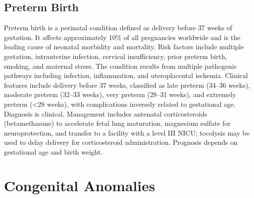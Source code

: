 \subsection{Preterm Birth}
\label{sec:Preterm Birth}
Preterm birth is a perinatal condition defined as delivery before 37 weeks of gestation. It affects approximately 10\% of all pregnancies worldwide and is the leading cause of neonatal morbidity and mortality. Risk factors include multiple gestation, intrauterine infection, cervical insufficiency, prior preterm birth, smoking, and maternal stress. The condition results from multiple pathogenic pathways including infection, inflammation, and uteroplacental ischemia. Clinical features include delivery before 37 weeks, classified as late preterm (34--36 weeks), moderate preterm (32--33 weeks), very preterm (28--31 weeks), and extremely preterm (<28 weeks), with complications inversely related to gestational age. Diagnosis is clinical. Management includes antenatal corticosteroids (betamethasone) to accelerate fetal lung maturation, magnesium sulfate for neuroprotection, and transfer to a facility with a level III NICU; tocolysis may be used to delay delivery for corticosteroid administration. Prognosis depends on gestational age and birth weight.

\section{Congenital Anomalies}








\label{sec:Congenital Anomalies}

